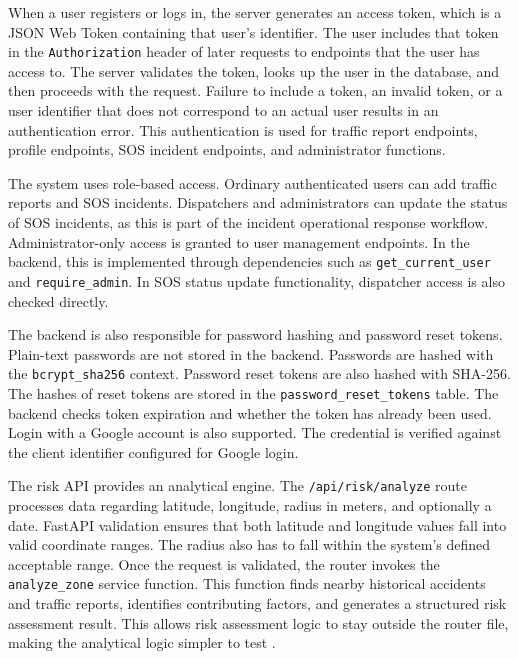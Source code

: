 ﻿\documentclass[12pt,a4paper]{report}
\begin{document}
When a user registers or logs in, the server generates an access token, which is a JSON Web Token containing that user's identifier. The user includes that token in the \texttt{Authorization} header of later requests to endpoints that the user has access to. The server validates the token, looks up the user in the database, and then proceeds with the request. Failure to include a token, an invalid token, or a user identifier that does not correspond to an actual user results in an authentication error. This authentication is used for traffic report endpoints, profile endpoints, SOS incident endpoints, and administrator functions.

The system uses role-based access. Ordinary authenticated users can add traffic reports and SOS incidents. Dispatchers and administrators can update the status of SOS incidents, as this is part of the incident operational response workflow. Administrator-only access is granted to user management endpoints. In the backend, this is implemented through dependencies such as \texttt{get\_current\_user} and \texttt{require\_admin}. In SOS status update functionality, dispatcher access is also checked directly.

The backend is also responsible for password hashing and password reset tokens. Plain-text passwords are not stored in the backend. Passwords are hashed with the \texttt{bcrypt\_sha256} context. Password reset tokens are also hashed with SHA-256. The hashes of reset tokens are stored in the \texttt{password\_reset\_tokens} table. The backend checks token expiration and whether the token has already been used. Login with a Google account is also supported. The credential is verified against the client identifier configured for Google login.

The risk API provides an analytical engine. The \texttt{/api/risk/analyze} route processes data regarding latitude, longitude, radius in meters, and optionally a date. FastAPI validation ensures that both latitude and longitude values fall into valid coordinate ranges. The radius also has to fall within the system's defined acceptable range. Once the request is validated, the router invokes the \texttt{analyze\_zone} service function. This function finds nearby historical accidents and traffic reports, identifies contributing factors, and generates a structured risk assessment result. This allows risk assessment logic to stay outside the router file, making the analytical logic simpler to test \cite{xie2013}.
\end{document}

